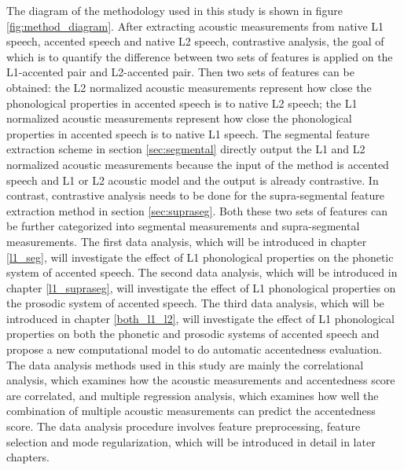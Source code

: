 The diagram of the methodology used in this study is shown in figure \ref{fig:method_diagram}. After extracting acoustic measurements from native L1 speech, accented speech and native L2 speech, contrastive analysis, the goal of which is to quantify the difference between two sets of features is applied on the L1-accented pair and L2-accented pair. Then two sets of features can be obtained: the L2 normalized acoustic measurements represent how close the phonological properties in accented speech is to native L2 speech; the L1 normalized acoustic measurements represent how close the phonological properties in accented speech is to native L1 speech. The segmental feature extraction scheme in section \ref{sec:segmental} directly output the L1 and L2 normalized acoustic measurements because the input of the method is accented speech and L1 or L2 acoustic model and the output is already contrastive. In contrast, contrastive analysis needs to be done for the supra-segmental feature extraction method in section \ref{sec:supraseg}. Both these two sets of features can be further categorized into segmental measurements and supra-segmental measurements. The first data analysis, which will be introduced in chapter \ref{l1_seg}, will investigate the effect of L1 phonological properties on the phonetic system of accented speech.  The second data analysis, which will be introduced in chapter \ref{l1_supraseg}, will investigate the effect of L1 phonological properties on the prosodic system of accented speech. The third data analysis, which will be introduced in chapter \ref{both_l1_l2}, will investigate the effect of L1 phonological properties on both the phonetic and prosodic systems of accented speech and propose a new computational model to do automatic accentedness evaluation. The data analysis methods used in this study are mainly the correlational analysis, which examines how the acoustic measurements and accentedness score are correlated, and multiple regression analysis, which examines how well the combination of multiple acoustic measurements can predict the accentedness score. The data analysis procedure involves feature preprocessing, feature selection and mode regularization, which will be introduced in detail in later chapters.
